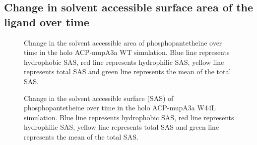 \begin{singlespacing}
\newpage
	\subsection{Change in solvent accessible surface area of the ligand over time}
	\label{sec:AppIII:SASA}							

		\setlength\fboxsep{5pt}
		\setlength\fboxrule{1.5pt}
		\begin{figure}[htbp]
		\centering
		\caption[Change in the solvent accessible surface (SAS) of phosphopantetheine over time in the holo ACP-mupA3a WT simulation.]{Change in the solvent accessible area of phosphopantetheine over time in the holo ACP-mupA3a WT simulation. Blue line represents hydrophobic SAS, red line represents hydrophilic SAS, yellow line represents total SAS and green line represents the mean of the total SAS.}
		\label{fig:sasACPPPTWild_area}
		\end{figure}

		\setlength\fboxsep{5pt}
		\setlength\fboxrule{1.5pt}
		\begin{figure}[htbp]
		\centering
		\caption[Change in the solvent accessible surface (SAS) of phosphopantetheine over time in the holo ACP-mupA3a W44L simulation.]{Change in the solvent accessible surface (SAS) of phosphopantetheine over time in the holo ACP-mupA3a W44L simulation. Blue line represents hydrophobic SAS, red line represents hydrophilic SAS, yellow line represents total SAS and green line represents the mean of the total SAS.}
		\label{fig:sasACPPPTMutant_area}
		\end{figure}


\end{singlespacing}
